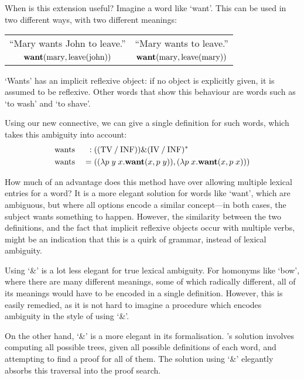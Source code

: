 When is this extension useful? Imagine a word like `want'. This can be
used in two different ways, with two different meanings:\\
\begin{center}
  \vspace{-1\baselineskip}
  \renewcommand{\arraystretch}{1}
  \begin{tabular}{c c}
    ``Mary wants John to leave.'' & ``Mary wants to leave.''\\
    $\WANT(\mary,\leave(\john))$  & $\WANT(\mary,\leave(\mary))$
  \end{tabular}
\end{center}
`Wants' has an implicit reflexive object: if no object is explicitly
given, it is assumed to be reflexive. Other words that show this
behaviour are words such as `to wash' and `to shave'.

Using our new connective, we can give a single definition for such
words, which takes this ambiguity into account:
\begin{alignat*}{3}
  &\wants\;&:\;&\tr[((\TV\impl\INF))\&(\IV\impl\INF)]\\
  &\wants\;&=\;&((\lambda p\;y\;x.\WANT(x,p\;y)),(\lambda p\;x.\WANT(x,p\;x)))
\end{alignat*}

How much of an advantage does this method have over allowing multiple
lexical entries for a word? It is a more elegant solution for words
like `want', which are ambiguous, but where all options encode a
similar concept---in both cases, the subject wants something to
happen. However, the similarity between the two definitions, and the
fact that implicit reflexive objects occur with multiple verbs, might
be an indication that this is a quirk of grammar, instead of lexical
ambiguity.

Using `\&' is a lot less elegant for true lexical ambiguity. For
homonyms like `bow', where there are many different meanings, some of
which radically different, all of its meanings would have to be
encoded in a single definition. However, this is easily remedied, as
it is not hard to imagine a procedure which encodes ambiguity in the
style of \citeauthor{lambek1958} using `\&'.

On the other hand, `\&' is a more elegant in its formalisation.
\citeauthor{lambek1958}'s solution involves computing all possible
trees, given all possible definitions of each word, and attempting to
find a proof for all of them. The solution using `\&' elegantly
absorbs this traversal into the proof search.
